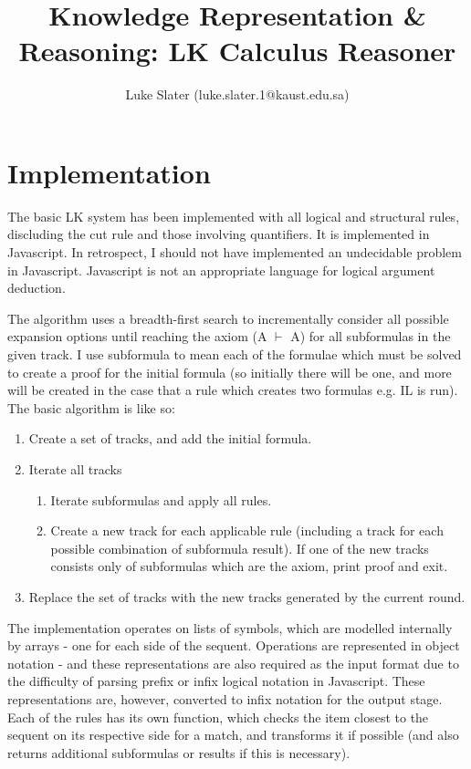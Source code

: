 \documentclass{article}
\begin{document}
\setlength{\parskip}{\medskipamount}
\setlength{\parindent}{0pt}

\title{Knowledge Representation \& Reasoning: LK Calculus Reasoner}
\author{Luke Slater (luke.slater.1@kaust.edu.sa)}

\maketitle

\pagebreak

\section{Implementation}

The basic LK system has been implemented with all logical and structural rules,
discluding the cut rule and those involving quantifiers. It is implemented in
Javascript. In retrospect, I should not have implemented an undecidable problem in
Javascript. Javascript is not an appropriate language for logical argument
deduction.

The algorithm uses a breadth-first search to incrementally consider all possible
expansion options until reaching the axiom (A $\vdash$ A) for all subformulas in
the given track. I use subformula to mean each of the formulae which must be
solved to create a proof for the initial formula (so initially there will be
one, and more will be created in the case that a rule which creates two formulas
e.g. IL is run). The basic algorithm is like so:

\begin{enumerate}
  \item Create a set of tracks, and add the initial formula.
  \item Iterate all tracks
    \begin{enumerate}
      \item Iterate subformulas and apply all rules.
      \item Create a new track for each applicable rule (including a track for each 
      possible combination of subformula result). If one of the new tracks
      consists only of subformulas which are the axiom, print proof and exit.
    \end{enumerate}
  \item Replace the set of tracks with the new tracks generated by the current
  round.
\end{enumerate}

The implementation operates on lists of symbols, which are modelled internally
by arrays - one for each side of the sequent. Operations are represented in
object notation - and these representations are also required as the input
format due to the difficulty of parsing prefix or infix logical notation in
Javascript. These representations are, however, converted to infix notation for
the output stage. Each of the rules has its own function, which checks the item
closest to the sequent on its respective side for a match, and transforms it if
possible (and also returns additional subformulas or results if this is
necessary).
\end{document}
